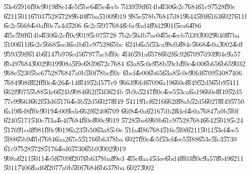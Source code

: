 \documentclass[12pt,a4paper]{article}
\begin{document}
\U{53e6}\U{5916}\U{ff0c}\U{9019}\U{88e1}\U{4e5f}\U{5be6}\U{4f5c}\U{4ecb}%
\U{7d39}\U{59ff}\U{614b}\U{4f30}\U{6e2c}\U{7684}\U{61c9}\U{7528}\U{ff0c}%
\U{6211}\U{5011}\U{6703}\U{7528}\U{5728}\U{9640}\U{87ba}\U{5100}\U{9019}%
\U{985e}\U{578b}\U{7684}\U{7d81}\U{9644}\U{5f0f}\U{6163}\U{6027}\U{611f}%
\U{6e2c}\U{5668}\cite[Ch 3.6.4]{titterton}\U{4e0a}\U{ff0c}\U{7a4d}\U{5206}%
\U{6e2c}\U{5f97}\U{7684}\U{8cbc}\U{9ad4}\U{89d2}\U{901f}\U{5ea6}\U{4f86}%
\U{4f5c}\U{59ff}\U{614b}\U{4f30}\U{6e2c}\U{ff0c}\U{9019}\U{5c07}\U{5728}%
\U{7b2c}\U{56db}\U{7ae0}\U{4f5c}\U{4ecb}\U{7d39}\U{3002}\U{9640}\U{87ba}%
\U{5100}\U{611f}\U{6e2c}\U{5668}\U{5ee3}\U{6cdb}\U{61c9}\U{7528}\U{65bc}%
\U{624b}\U{6a5f}\U{53ca}\U{98db}\U{884c}\U{5668}\U{4e0a}\U{3002}\U{4eff}%
\U{9593}\U{59ff}\U{614b}\U{6f14}\U{7b97}\U{6cd5}\U{6797}\U{7acb}\U{ff0c}%
\U{4f46}\U{591a}\U{6578}\U{662f}\U{6c92}\U{6709}\U{7d93}\U{904e}\U{9a57}%
\U{8b49}\U{7684}\U{3002}\U{9019}\U{908a}\U{5f9e}\U{6839}\U{672c}\U{7684}%
\U{63a8}\U{5c0e}\U{958b}\U{59cb}\U{ff0c}\U{4e00}\U{6b65}\U{6b65}\U{9032}%
\U{968e}\U{5230}\U{5be6}\U{7528}\U{7684}\U{7a0b}\U{5f0f}\U{78bc}\U{ff0c}%
\U{6bcf}\U{4e00}\U{6b65}\U{63a8}\U{5c0e}\U{90fd}\U{6709}\U{5408}\U{7406}%
\U{7684}\U{908f}\U{8f2f}\U{ff0c}\U{4e26}\U{4e14}\U{8f49}\U{52d5}\U{77e9}%
\U{9663}\U{90fd}\U{6709}\U{6a19}\U{660e}\U{8f49}\U{52d5}\U{65b9}\U{5411}%
\U{662f}\U{9075}\U{5b88}\U{5de6}\U{624b}\U{9084}\U{662f}\U{53f3}\U{624b}%
\U{5b9a}\U{5247}\U{ff0c}\U{4ee5}\U{53ca}\U{6a19}\U{660e}\U{8f49}\U{52d5}%
\U{77e9}\U{9663}\U{662f}\U{53d6}\U{5176}\U{4e3b}\U{52d5}\U{6027}\U{8f49}%
\U{5411}\U{91cf}\U{6216}\U{662f}\U{88ab}\U{52d5}\U{6027}\U{8f49}\U{5750}%
\U{6a19}\U{8ef8}\U{ff0c}\U{9019}\U{4e00}\U{9ede}\U{662f}\U{6240}\U{6709}%
\U{66f8}\U{4e0a}\U{6216}\U{7db2}\U{8def}\U{4e0a}\U{7684}\U{7a0b}\U{5f0f}%
\U{6240}\U{5171}\U{540c}\U{7f3a}\U{4e4f}\U{7684}\U{ff0c}\U{800c}\U{9019}%
\U{5728}\U{5be6}\U{969b}\U{61c9}\U{7528}\U{7684}\U{6642}\U{5019}\U{5c24}%
\U{5176}\U{91cd}\U{8981}\U{ff0c}\U{9019}\U{6a23}\U{5b50}\U{63a8}\U{5c0e}%
\U{51fa}\U{4f86}\U{7684}\U{516c}\U{5f0f}\U{6211}\U{5011}\U{53ef}\U{4ee5}%
\U{5f88}\U{65b9}\U{4fbf}\U{7684}\U{6aa2}\U{67e5}\U{5176}\U{6b63}\U{78ba}%
\U{6027}\U{ff0c}\U{4e5f}\U{53ef}\U{4ee5}\U{5f88}\U{653e}\U{5fc3}\U{5730}%
\U{61c9}\U{7528}\U{5728}\U{5176}\U{4ed6}\U{5730}\U{65b9}\U{3002}\U{9019}%
\U{908a}\U{6211}\U{5011}\U{4e5f}\U{6709}\U{8207}\U{6b63}\U{78ba}\U{89e3}%
\U{4f5c}\U{8aa4}\U{5dee}\U{6bd4}\U{8f03}\U{ff0c}\U{9a57}\U{8b49}\U{6211}%
\U{5011}\U{7406}\U{8ad6}\U{8207}\U{7a0b}\U{5f0f}\U{7684}\U{6b63}\U{78ba}%
\U{6027}\U{3002}

\bigskip
\end{document}

